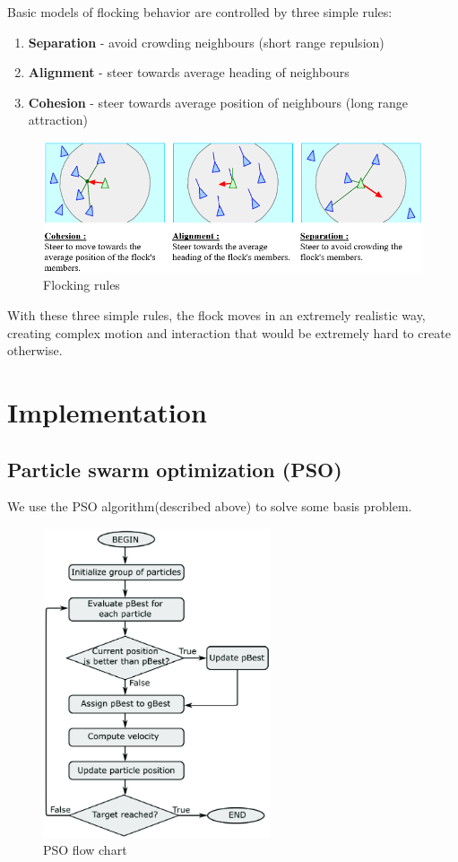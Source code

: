 Basic models of flocking behavior are controlled by three simple rules:
    \begin{enumerate}
        \item \textbf{Separation} - avoid crowding neighbours (short range repulsion)
        \item \textbf{Alignment} - steer towards average heading of neighbours
        \item \textbf{Cohesion} - steer towards average position of neighbours (long range attraction)
    \end{enumerate}

\newline \begin{figure}[H]
    \centering
    \includegraphics[width=1.0\textwidth]{images/flock.png}
    \caption{Flocking rules}
\end{figure}

With these three simple rules, the flock moves in an extremely realistic way, creating complex motion and interaction that would be extremely hard to create otherwise.

\section{Implementation}
\subsection{Particle swarm optimization (PSO)}
We use the PSO algorithm(described above) to solve some basis problem.
\begin{figure}[H]
    \centering
    \includegraphics[width=0.6\textwidth]{images/psoflowchart.png}
    \caption{PSO flow chart}
\end{figure}
